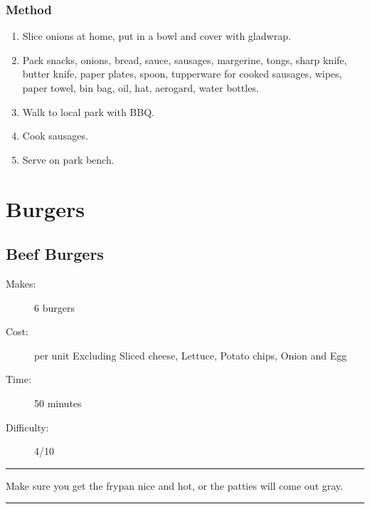 \documentclass[]{article}
\begin{document}
\subsubsection*{\Large Method}
\begin{enumerate}[font=\huge\color{accent}]
	\item Slice onions at home, put in a bowl and cover with gladwrap.
	\item Pack snacks, onions, bread, sauce, sausages, margerine, tongs, sharp knife, butter knife, paper plates, spoon, tupperware for cooked sausages, wipes, paper towel, bin bag, oil, hat, aerogard, water bottles.
	\item Walk to local park with BBQ.
	\item Cook sausages.
	\item Serve on park bench.
\end{enumerate}
\newpage
{}
\section*{\center\Huge\color{accent}Burgers}
\label{cat:Burgers}
\label{rec:Beef Burgers}
\subsection*{\center\huge Beef Burgers}
\begin{description}
\item[Makes:] 6 burgers
\item[Cost:]  per unit Excluding Sliced cheese, Lettuce, Potato chips, Onion and Egg
\item[Time:] 50 minutes
\item[Difficulty:] 4/10
\end{description}
\vspace{0.2cm}\hrule\vspace{0.5cm}
\begin{adjustwidth}{0.5 cm}{0.5 cm}

Make sure you get the frypan nice and hot, or the patties will come out gray. \hfill{}\color{black}

\end{adjustwidth}
\vspace{0.5cm}\hrule
\end{document}
